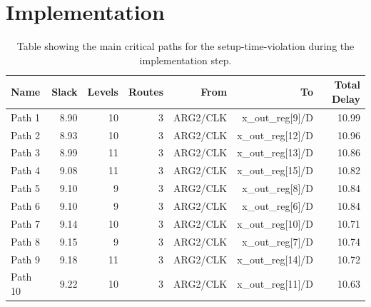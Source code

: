 \section{Implementation}
\begin{table}[H]
    \centering
    \small
    \captionsetup{skip=10pt} 
    \begin{tabular}{lrrrrrr}
        \hline
        Name    & Slack & Levels & Routes & From      & To                 & Total Delay \\
        \hline
        Path 1  & 8.90  & 10     & 3      & ARG2/CLK  & x\_out\_reg[9]/D   & 10.99       \\
        Path 2  & 8.93  & 10     & 3      & ARG2/CLK  & x\_out\_reg[12]/D  & 10.96       \\
        Path 3  & 8.99  & 11     & 3      & ARG2/CLK  & x\_out\_reg[13]/D  & 10.86       \\
        Path 4  & 9.08  & 11     & 3      & ARG2/CLK  & x\_out\_reg[15]/D  & 10.82       \\
        Path 5  & 9.10  & 9      & 3      & ARG2/CLK  & x\_out\_reg[8]/D   & 10.84       \\
        Path 6  & 9.10  & 9      & 3      & ARG2/CLK  & x\_out\_reg[6]/D   & 10.84       \\
        Path 7  & 9.14  & 10     & 3      & ARG2/CLK  & x\_out\_reg[10]/D  & 10.71       \\
        Path 8  & 9.15  & 9      & 3      & ARG2/CLK  & x\_out\_reg[7]/D   & 10.74       \\
        Path 9  & 9.18  & 11     & 3      & ARG2/CLK  & x\_out\_reg[14]/D  & 10.72       \\
        Path 10 & 9.22  & 10     & 3      & ARG2/CLK  & x\_out\_reg[11]/D  & 10.63       \\
        \hline
    \end{tabular}
    \caption{Table showing the main critical paths for the setup-time-violation during the implementation step.}
    \label{tab:setup_implementation}
\end{table}


